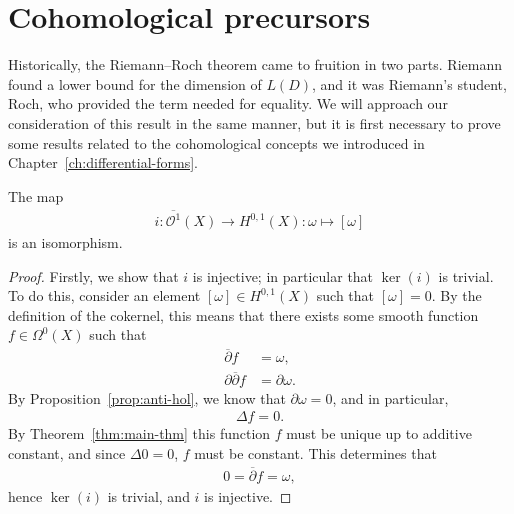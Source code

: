 \section{Cohomological precursors}
Historically, the Riemann--Roch theorem came to fruition in two
parts. Riemann found a lower bound
for the dimension of $ L ( D ) $, and it was Riemann's student, Roch, who
provided the term needed for equality. We will approach our consideration of
this result in the same manner, but it is first necessary to prove some results
related to the cohomological concepts we introduced in
Chapter~\ref{ch:differential-forms}.

\begin{lemma}
	The map
	\begin{align*}
		i:\overline{\mathcal{O}^{1}}(X) \to H ^{0,1}(X):\omega \mapsto [ \omega ]
	\end{align*}
	is an isomorphism.
	\begin{proof}
		Firstly, we show that $ i $ is injective; in particular that $ \ker(i) $
		is trivial. To do this, consider an element $ [ \omega ]\in H ^{0,1}(X) $
		such that $ [ \omega ]=0 $. By the definition of the cokernel, this means
		that there exists some smooth function $ f \in \Omega^0(X) $ such that
		\begin{align*}
			\overline{\partial }f          & = \omega,          \\
			\partial \overline{\partial }f & = \partial \omega.
		\end{align*}
		By Proposition~\ref{prop:anti-hol}, we know that $ \partial \omega=0 $, and
		in particular,
		\begin{align*}
			\Delta f = 0.
		\end{align*}
		By Theorem~\ref{thm:main-thm} this function $ f $ must be unique up to
		additive constant, and since $ \Delta 0 = 0 $, $ f $ must be constant. This
		determines that
		\begin{align*}
			0 = \overline{\partial }f = \omega,
		\end{align*}
		hence $ \ker(i) $ is trivial, and $ i $ is injective.


\end{proof}
\end{lemma}
